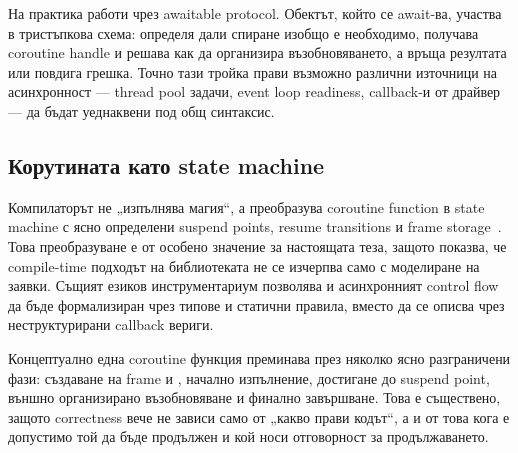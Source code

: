 На практика  работи чрез awaitable protocol. Обектът, който се await-ва, участва в тристъпкова схема:  определя дали спиране изобщо е необходимо,  получава coroutine handle и решава как да организира възобновяването, а  връща резултата или повдига грешка. Точно тази тройка прави възможно различни източници на асинхронност --- thread pool задачи, event loop readiness, callback-и от драйвер --- да бъдат уеднаквени под общ  синтаксис.

\subsection{Корутината като state machine}

Компилаторът не „изпълнява магия“, а преобразува coroutine function в state machine с ясно определени suspend points, resume transitions и frame storage~\cite{p0912r5,p1063r0}. Това преобразуване е от особено значение за настоящата теза, защото показва, че compile-time подходът на библиотеката не се изчерпва само с моделиране на заявки. Същият езиков инструментариум позволява и асинхронният control flow да бъде формализиран чрез типове и статични правила, вместо да се описва чрез неструктурирани callback вериги.

Концептуално една coroutine функция преминава през няколко ясно разграничени фази: създаване на frame и , начално изпълнение, достигане до suspend point, външно организирано възобновяване и финално завършване. Това е съществено, защото correctness вече не зависи само от „какво прави кодът“, а и от това кога е допустимо той да бъде продължен и кой носи отговорност за продължаването.

